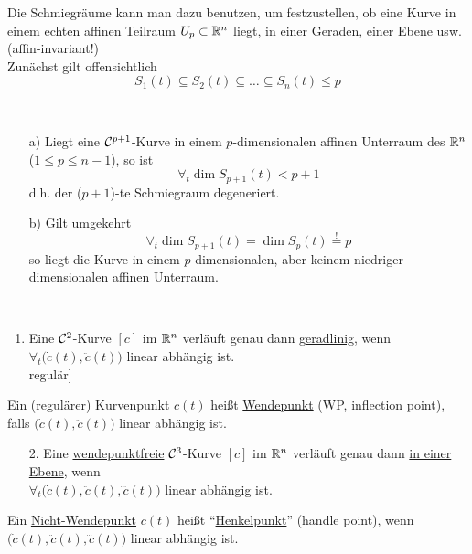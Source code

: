 Die Schmiegräume kann man dazu benutzen, um festzustellen, ob eine Kurve in einem echten affinen Teilraum \(U_p \subset \mathbb{R}^n\) liegt, in einer Geraden, einer Ebene usw. (affin-invariant!) \\
Zunächst gilt offensichtlich 
\[
 S_1(t) \subseteq S_2(t) \subseteq \dots \subseteq S_n(t) \le p
\]

\begin{satz}\label{satz112} \(\)
 \begin{enumerate}
  \item[a)] Liegt eine \(\mathcal{C}^{p+1}\)-Kurve in einem \(p\)-dimensionalen affinen Unterraum des \(\mathbb{R}^n\) (\(1 \le p \le n-1 \)), so ist
  \[
   \forall_t \dim S_{p+1}(t) < p+1
  \]
  d.h. der (\(p+1\))-te Schmiegraum degeneriert.
  \item[b)] Gilt umgekehrt 
  \[
   \forall_t \dim S_{p+1}(t) = \dim S_p(t) \stackrel{!}{=} p
  \]
  so liegt die Kurve in einem \(p\)-dimensionalen, aber keinem niedriger dimensionalen affinen Unterraum.
 \end{enumerate}
\end{satz}

\begin{anwendung} \(\)
 \begin{enumerate}
  \item Eine \(\mathcal{C}^2\)-Kurve \([c]\) im \(\mathbb{R}^n\) verläuft genau dann \uline{geradlinig}, wenn \(\forall_t \big(\dot c(t), \ddot c(t)\big) \) linear abhängig ist. \\
  \big["`\(\Rightarrow\)"' nach a), "`\(\Leftarrow\)"' nach b), da \([c]\) regulär\big]
 \end{enumerate}
 \begin{definition}
  Ein (regulärer) Kurvenpunkt \(c(t)\) heißt \uline{Wendepunkt} (WP, inflection point), falls \(\big(\dot c(t), \ddot c(t)\big)\) linear abhängig ist.
 \end{definition}
 \begin{enumerate}
  \item[2.] Eine \uline{wendepunktfreie} \(\mathcal{C}^3\)-Kurve \([c]\) im \(\mathbb{R}^n\) verläuft genau dann \uline{in einer Ebene}, wenn \\ 
  \(\forall_t \big( \dot c(t), \ddot c(t), \dddot c(t) \big) \) linear abhängig ist.
 \end{enumerate}
 \begin{definition}
  Ein \uline{Nicht-Wendepunkt} \(c(t)\) heißt "`\uline{Henkelpunkt}"' (handle point), wenn \( \big( \dot c(t), \ddot c(t), \dddot c(t) \big) \) linear abhängig ist.
 \end{definition}

\end{anwendung}

